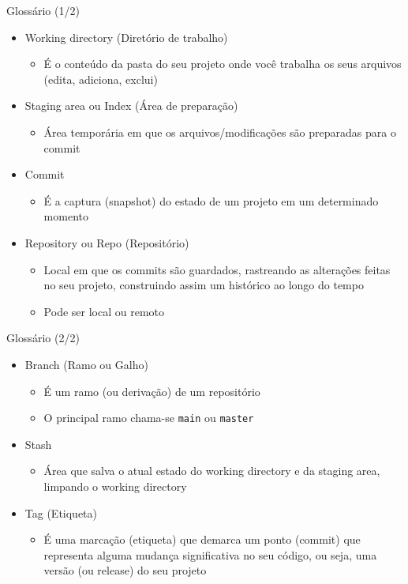 \documentclass[14pt]{beamer}
\begin{document}
\begin{frame}{Glossário (1/2)}
    \begin{itemize}
        \item Working directory (Diretório de trabalho)
        \begin{itemize}
            \item É o conteúdo da pasta do seu projeto onde você trabalha os
            seus arquivos (edita, adiciona, exclui)
        \end{itemize}
        \item Staging area ou Index (Área de preparação)
        \begin{itemize}
            \item Área temporária em que os arquivos/modificações são preparadas
            para o commit 
        \end{itemize}
        \item Commit
        \begin{itemize}
            \item É a captura (snapshot) do estado de um projeto em um
            determinado momento
        \end{itemize}
        \item Repository ou Repo (Repositório)
        \begin{itemize}
            \item Local em que os commits são guardados, rastreando as
            alterações feitas no seu projeto, construindo assim um histórico ao
            longo do tempo
            \item Pode ser local ou remoto
        \end{itemize}
    \end{itemize}
\end{frame}

\begin{frame}{Glossário (2/2)}
    \begin{itemize}
        \item Branch (Ramo ou Galho)
        \begin{itemize}
            \item É um ramo (ou derivação) de um repositório
            \item O principal ramo chama-se \texttt{main} ou \texttt{master}
        \end{itemize}
        \item Stash
        \begin{itemize}
            \item Área que salva o atual estado do working directory e da
            staging area, limpando o working directory
        \end{itemize}
        \item Tag (Etiqueta)
        \begin{itemize}
            \item É uma marcação (etiqueta) que demarca um ponto (commit) que
            representa alguma mudança significativa no seu código, ou seja, uma
            versão (ou release) do seu projeto
        \end{itemize}        
    \end{itemize}
\end{frame}
\end{document}

